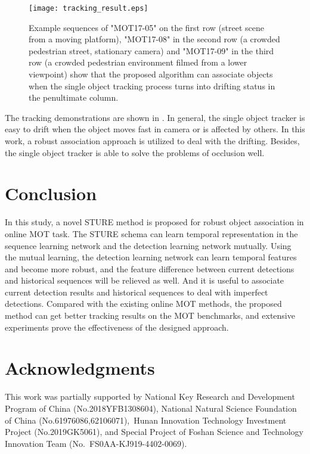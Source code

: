 \documentclass[times,twocolumn,final,authoryear]{elsarticle}
\begin{document}
\begin{figure}[!ht]
	\centering
	\texttt{[image: tracking\_result.eps]}
	\caption{Example sequences of "MOT17-05" on the first row (street scene from a moving platform), {"MOT17-08" in the second row (a crowded pedestrian street, stationary camera)} and "MOT17-09" in the third row (a crowded pedestrian environment filmed from a lower viewpoint) show that the proposed algorithm can associate objects when the single object tracking process turns into drifting status in the penultimate column.}
	\label{fig:tracking_result}
\end{figure}

The tracking {demonstrations are} shown in . 
In general, the single object tracker is easy to drift when the object moves fast in camera or is affected by others. 
In this work, a robust association approach is utilized to deal with the drifting. 
Besides, the single object tracker is able to solve the problems of occlusion well.


\section{Conclusion}
In this study, a novel STURE method is proposed for robust object association in online MOT task. 
The STURE schema can learn temporal representation in the sequence learning network and the detection learning network mutually.
Using the mutual learning, the detection learning network can learn temporal features and become more robust, and the feature difference between current detections and historical sequences will be relieved as well.
And it is useful to associate current detection {results} and historical sequences to deal with imperfect {detections}.
Compared with the existing online MOT methods, the proposed method can get better tracking results on the MOT benchmarks,
and extensive experiments prove the effectiveness of the designed approach.


\section*{Acknowledgments}
This work was partially supported by National Key Research and Development Program of China (No.2018YFB1308604), National Natural Science Foundation of China (No.61976086,62106071), Hunan Innovation Technology Investment Project (No.2019GK5061), and Special Project of Foshan Science and Technology Innovation Team (No. FS0AA-KJ919-4402-0069).
\end{document}
